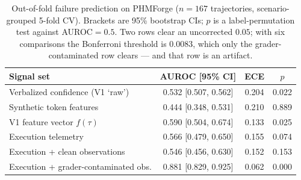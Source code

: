 \begin{table}[t]
\centering
\caption{Out-of-fold failure prediction on PHMForge ($n=167$ trajectories, scenario-grouped 5-fold CV). Brackets are 95\% bootstrap CIs; $p$ is a label-permutation test against AUROC${=}0.5$. Two rows clear an uncorrected $0.05$; with six comparisons the Bonferroni threshold is $0.0083$, which only the grader-contaminated row clears --- and that row is an artifact.}
\label{tab:main}
\footnotesize
\begin{tabular}{lccc}
\toprule
\textbf{Signal set} & \textbf{AUROC [95\% CI]} & \textbf{ECE} & $p$ \\
\midrule
Verbalized confidence (V1 `raw') & 0.532 [0.507, 0.562] & 0.204 & 0.022 \\
Synthetic token features & 0.444 [0.348, 0.531] & 0.210 & 0.889 \\
V1 feature vector $f(\tau)$ & 0.590 [0.504, 0.674] & 0.133 & 0.025 \\
Execution telemetry & 0.566 [0.479, 0.650] & 0.155 & 0.074 \\
Execution + clean observations & 0.546 [0.456, 0.630] & 0.152 & 0.153 \\
\midrule
Execution + grader-contaminated obs. & 0.881 [0.829, 0.925] & 0.062 & 0.000 \\
\bottomrule
\end{tabular}
\end{table}

